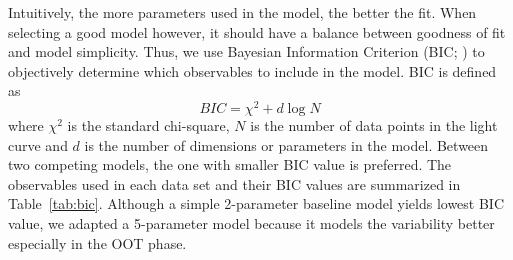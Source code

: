 Intuitively, the more parameters used in the model, the better the fit. 
When selecting a good model however, it should have a balance between goodness of fit and model simplicity. Thus, we use Bayesian Information Criterion (BIC; \cite{Schwarz1978}) to objectively determine which observables to include in the model. BIC is defined as
\begin{equation}
BIC = \chi^2 +d\log N
\end{equation}
where $\chi^2$ is the standard chi-square, $N$ is the number of data points in the light curve and $d$ is the number of dimensions or parameters in the model. Between two competing models, the one with smaller BIC value is preferred. The observables used in each data set and their BIC values are summarized in Table~\ref{tab:bic}. %
Although a simple 2-parameter baseline model yields lowest BIC value, we adapted a 5-parameter model because it models the variability better especially in the OOT phase. %


